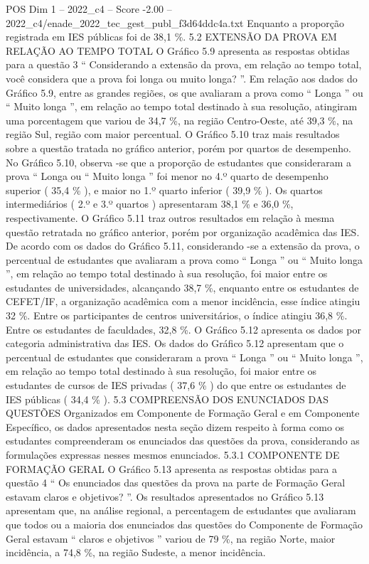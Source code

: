 \begin{textsample}{POS Dim 1 – 2022\_c4 – Score -2.00 – 2022\_c4/enade\_2022\_tec\_gest\_publ\_f3d64ddc4a.txt}
Enquanto a proporção registrada em IES públicas foi de 38,1 \%. 5.2 EXTENSÃO DA PROVA EM RELAÇÃO AO TEMPO TOTAL O Gráfico 5.9 apresenta as respostas obtidas para a questão 3 “ Considerando a extensão da prova, em relação ao tempo total, você considera que a prova foi longa ou muito longa? ”.
Em relação aos dados do Gráfico 5.9, entre as grandes regiões, os que avaliaram a prova como “ Longa ” ou “ Muito longa ”, em relação ao tempo total destinado à sua resolução, atingiram uma porcentagem que variou de 34,7 \%, na região Centro-Oeste, até 39,3 \%, na região Sul, região com maior percentual.
O Gráfico 5.10 traz mais resultados sobre a questão tratada no gráfico anterior, porém por quartos de desempenho.
No Gráfico 5.10, observa -se que a proporção de estudantes que consideraram a prova “ Longa ou “ Muito longa ” foi menor no 4.º quarto de desempenho superior ( 35,4 \% ), e maior no 1.º quarto inferior ( 39,9 \% ).
Os quartos intermediários ( 2.º e 3.º quartos ) apresentaram 38,1 \% e 36,0 \%, respectivamente.
O Gráfico 5.11 traz outros resultados em relação à mesma questão retratada no gráfico anterior, porém por organização acadêmica das IES.
De acordo com os dados do Gráfico 5.11, considerando -se a extensão da prova, o percentual de estudantes que avaliaram a prova como “ Longa ” ou “ Muito longa ”, em relação ao tempo total destinado à sua resolução, foi maior entre os estudantes de universidades, alcançando 38,7 \%, enquanto entre os estudantes de CEFET/IF, a organização acadêmica com a menor incidência, esse índice atingiu 32 \%.
Entre os participantes de centros universitários, o índice atingiu 36,8 \%.
Entre os estudantes de faculdades, 32,8 \%.
O Gráfico 5.12 apresenta os dados por categoria administrativa das IES.
Os dados do Gráfico 5.12 apresentam que o percentual de estudantes que consideraram a prova “ Longa ” ou “ Muito longa ”, em relação ao tempo total destinado à sua resolução, foi maior entre os estudantes de cursos de IES privadas ( 37,6 \% ) do que entre os estudantes de IES públicas ( 34,4 \% ). 5.3 COMPREENSÃO DOS ENUNCIADOS DAS QUESTÕES Organizados em Componente de Formação Geral e em Componente Específico, os dados apresentados nesta seção dizem respeito à forma como os estudantes compreenderam os enunciados das questões da prova, considerando as formulações expressas nesses mesmos enunciados. 5.3.1 COMPONENTE DE FORMAÇÃO GERAL O Gráfico 5.13 apresenta as respostas obtidas para a questão 4 “ Os enunciados das questões da prova na parte de Formação Geral estavam claros e objetivos? ”.
Os resultados apresentados no Gráfico 5.13 apresentam que, na análise regional, a percentagem de estudantes que avaliaram que todos ou a maioria dos enunciados das questões do Componente de Formação Geral estavam “ claros e objetivos ” variou de 79 \%, na região Norte, maior incidência, a 74,8 \%, na região Sudeste, a menor incidência.

\end{textsample}
